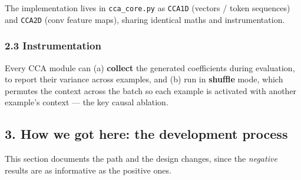 \documentclass[
  11pt,
]{article}
\begin{document}
The implementation lives in \texttt{cca\_core.py} as \texttt{CCA1D}
(vectors / token sequences) and \texttt{CCA2D} (conv feature maps),
sharing identical maths and instrumentation.

\subsubsection{2.3 Instrumentation}\label{instrumentation}

Every CCA module can (a) \textbf{collect} the generated coefficients
during evaluation, to report their variance across examples, and (b) run
in \textbf{shuffle} mode, which permutes the context across the batch so
each example is activated with another example's context --- the key
causal ablation.

\subsection{3. How we got here: the development
process}\label{how-we-got-here-the-development-process}

This section documents the path and the design changes, since the
\emph{negative} results are as informative as the positive ones.
\end{document}
